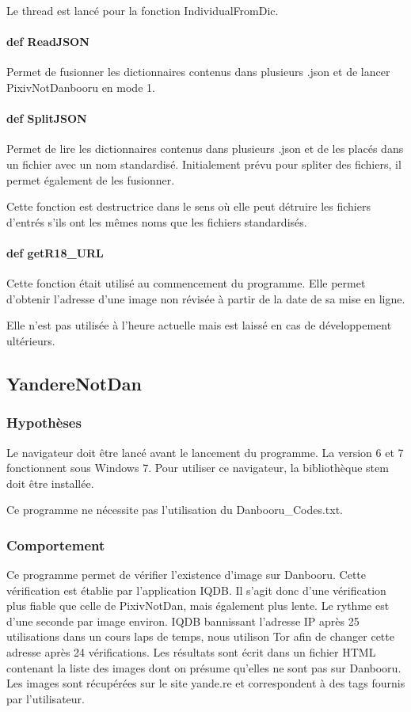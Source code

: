 \documentclass[a4paper,12pt]{article}
\begin{document}
Le thread est lancé pour la fonction IndividualFromDic.

\paragraph{def ReadJSON}
Permet de fusionner les dictionnaires contenus dans plusieurs .json et de lancer PixivNotDanbooru en mode 1.
\paragraph{def SplitJSON}
Permet de lire les dictionnaires contenus dans plusieurs .json et de les placés dans un fichier avec un nom standardisé. Initialement prévu pour spliter des fichiers, il permet également de les fusionner.

Cette fonction est destructrice dans le sens où elle peut détruire les fichiers d'entrés s'ils ont les mêmes noms que les fichiers standardisés.
\paragraph{def getR18\_URL}
Cette fonction était utilisé au commencement du programme. Elle permet d'obtenir l'adresse d'une image non révisée à partir de la date de sa mise en ligne.

Elle n'est pas utilisée à l'heure actuelle mais est laissé en cas de développement ultérieurs.

\subsection{YandereNotDan}
\subsubsection{Hypothèses}
Le navigateur doit être lancé avant le lancement du programme. La version 6 et 7 fonctionnent sous Windows 7. Pour utiliser ce navigateur, la bibliothèque stem doit être installée.

Ce programme ne nécessite pas l'utilisation du Danbooru\_Codes.txt.
\subsubsection{Comportement}
Ce programme permet de vérifier l'existence d'image sur Danbooru. Cette vérification est établie par l'application IQDB. Il s'agit donc d'une vérification plus fiable que celle de PixivNotDan, mais également plus lente. Le rythme est d'une seconde par image environ.
IQDB bannissant l'adresse IP après 25 utilisations dans un cours laps de temps, nous utilison Tor afin de changer cette adresse après 24 vérifications.
Les résultats sont écrit dans un fichier HTML contenant la liste des images dont on présume qu'elles ne sont pas sur Danbooru. 
Les images sont récupérées sur le site yande.re et correspondent à des tags fournis par l'utilisateur.
\end{document}
